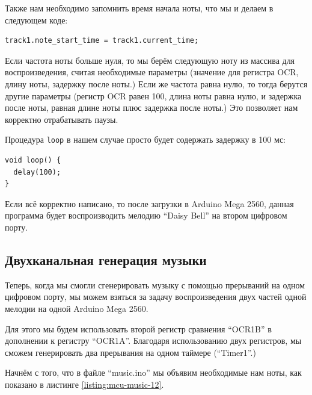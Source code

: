 \documentclass[../sparc.tex]{subfiles}
\begin{document}
Также нам необходимо запомнить время начала ноты, что мы и делаем в следующем
коде:

\begin{verbatim}
track1.note_start_time = track1.current_time;
\end{verbatim}

Если частота ноты больше нуля, то мы берём следующую ноту из массива для
воспроизведения, считая необходимые параметры (значение для регистра OCR, длину
ноты, задержку после ноты.)  Если же частота равна нулю, то тогда берутся другие
параметры (регистр OCR равен 100, длина ноты равна нулю, и задержка после ноты,
равная длине ноты плюс задержка после ноты.)  Это позволяет нам корректно
отрабатывать паузы.

Процедура \texttt{loop} в нашем случае просто будет содержать задержку
в 100 мс:

\begin{verbatim}
void loop() {
  delay(100);
}
\end{verbatim}

Если всё корректно написано, то после загрузки в Arduino Mega 2560, данная
программа будет воспроизводить мелодию ``Daisy Bell'' на втором цифровом порту.

\subsection{Двухканальная генерация музыки}

Теперь, когда мы смогли сгенерировать музыку с помощью прерываний на одном
цифровом порту, мы можем взяться за задачу воспроизведения двух частей одной
мелодии на одной Arduino Mega 2560.

Для этого мы будем использовать второй регистр сравнения ``OCR1B'' в дополнении
к регистру ``OCR1A''.  Благодаря использованию двух регистров, мы сможем
генерировать два прерывания на одном таймере (``Timer1''.)

Начнём с того, что в файле ``music.ino'' мы объявим необходимые нам ноты, как
показано в листинге \ref{listing:mcu-music-12}.
\end{document}
